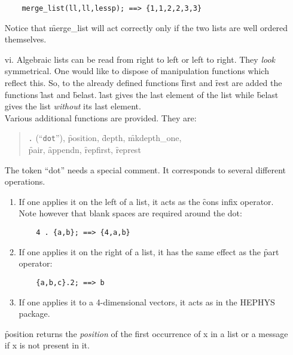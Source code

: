 \begin{itemize}
\begin{verbatim}
    merge_list(ll,ll,lessp); ==> {1,1,2,2,3,3}
\end{verbatim}
Notice that \f{merge\_list} will act correctly only if the two lists 
are well ordered themselves. 
\item[vi.]
Algebraic lists can be read from right to left or left to right.
They \emph{look} symmetrical. One would like to dispose of manipulation
functions which reflect this.
\hypertarget{operator:LAST}{}
\hypertarget{operator:BELAST}{}
So, to the already defined functions  \f{first} and \f{rest} are
added the functions \f{last}  and \f{belast}. \f{last} gives the last
element of the list while \f{belast} gives the list \emph{without} its
last element. \\
Various additional functions are provided. They are:
\hypertarget{operator:POSITION}{}
\hypertarget{operator:DEPTH}{}
\hypertarget{operator:MKDEPTH_ONE}{}
\hypertarget{operator:PAIR}{}
\hypertarget{operator:APPENDN}{}
\hypertarget{operator:REPFIRST}{}
\hypertarget{operator:REPREST}{}
\begin{quote}
\texttt{.} (``\texttt{dot}''), \f{position}, \f{depth}, \f{mkdepth\_one}, \\
\f{pair}, \f{appendn}, \f{repfirst}, \f{represt}
\end{quote}
The token ``dot'' needs a special comment. It corresponds to
several different operations.
\begin{enumerate}
\item If one applies it on the left of a list, it acts as the \f{cons}
infix operator. Note however that blank spaces are required around the dot:
\begin{verbatim}
    4 . {a,b}; ==> {4,a,b}
\end{verbatim}
\item If one applies it on the right of a list, it has the same
effect as the \f{part} operator:
\begin{verbatim}
    {a,b,c}.2; ==> b
\end{verbatim}
\item If one applies it to  a 4-dimensional vectors, it acts as in the
HEPHYS package.
\end{enumerate}
\f{position} returns the \emph{position} of the first occurrence of x in
a list or a message if x is not present in it.


\end{itemize}
